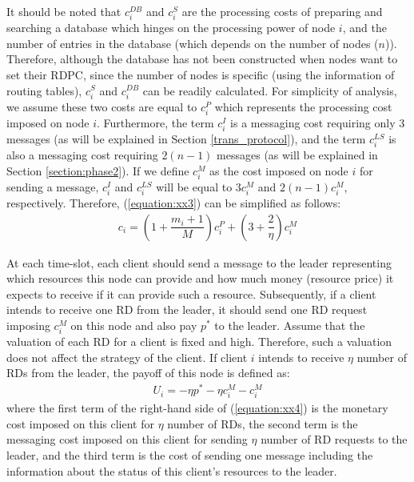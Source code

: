 \documentclass[journal,12pt, onecolumn]{IEEEtran}
\begin{document}
It should be noted that $c_i^{DB}$ and $c_i^{S}$ are the processing costs of preparing and searching a database which hinges on the processing power of node $i$, and the number of entries in the database (which depends on the number of nodes ($n$)). Therefore, although the database has not been constructed when nodes want to set their RDPC, since the number of nodes is specific (using the information of routing tables), $c_i^{S}$ and $c_i^{DB}$ can be readily calculated.
For simplicity of analysis, we assume these two costs are equal to $c_i^{P}$ which represents the processing cost imposed on node $i$. Furthermore, the term $c_i^{I}$ is a messaging cost requiring only 3 messages (as will be explained in Section \ref{trans_protocol}), and the term $c_i^{LS}$ is also a messaging cost requiring $2(n-1)$ messages (as will be explained in Section \ref{section:phase2}). If we define $c_i^{M}$ as the cost imposed on node $i$ for sending a message, $c_i^{I}$ and $c_i^{LS}$ will be equal to $3c_i^{M}$ and $2(n-1)c_i^{M}$, respectively. Therefore, (\ref{equation:xx3}) can be simplified as follows:
\begin{align}
\label{equation:xx333}
c_i = (1 + \dfrac{m_i +1}{M})c_i ^{P} + (3+\dfrac{2}{\eta})c_i ^{M}
\end{align} 

At each time-slot, each client should send a message to the leader representing which resources this node can provide and how much money (resource price) it expects to receive if it can provide such a resource. Subsequently, if a client intends to receive one RD from the leader, it should send one RD request imposing $c_i ^{M}$ on this node and also pay $p^*$ to the leader. Assume that the valuation of each RD for a client is fixed and high. Therefore, such a valuation does not affect the strategy of the client. If client $i$ intends to receive $\eta$ number of RDs from the leader, the payoff of this node is defined as:
\begin{align}
\label{equation:xx4}
U_i = -\eta p^* -\eta c_i ^{M} - c_i ^{M} 
\end{align}
where the first term of the right-hand side of (\ref{equation:xx4}) is the monetary cost imposed on this client for $\eta$ number of RDs, the second term is the messaging cost imposed on this client for sending $\eta$ number of RD requests to the leader, and the third term is the cost of sending one message including the information about the status of this client's resources to the leader.
\end{document}
